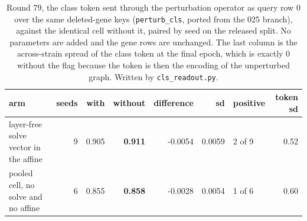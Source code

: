 \begin{table}[H]
  \centering
  \footnotesize
  \caption[Round 79: the perturbed class token]{Round 79, the class token sent through the perturbation operator as query row 0 over the same deleted-gene keys (\texttt{perturb\_cls}, ported from the 025 branch), against the identical cell without it, paired by seed on the released split. No parameters are added and the gene rows are unchanged. The last column is the across-strain spread of the class token at the final epoch, which is exactly 0 without the flag because the token is then the encoding of the unperturbed graph. Written by \texttt{cls\_readout.py}.}
  \label{tab:cls-readout}
  \begin{tabular}{@{}lrrrrrlr@{}}
    \hline
    arm & seeds & with & without & difference & sd & positive & token sd \\
    \hline
    layer-free solve vector in the affine & 9 & 0.905 & \textbf{0.911} & -0.0054 & 0.0059 & 2 of 9 & 0.52 \\
    pooled cell, no solve and no affine & 6 & 0.855 & \textbf{0.858} & -0.0028 & 0.0054 & 1 of 6 & 0.60 \\
    \hline
  \end{tabular}
\end{table}
